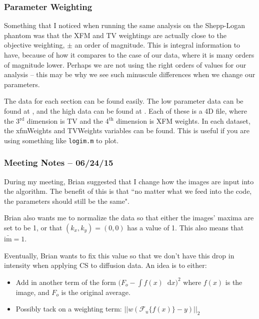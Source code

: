 \documentclass[11 pt]{article}
\newcommand*\diff{\mathop{}\!\mathrm{d}}
\begin{document}
    \subsubsection{Parameter Weighting}
      Something that I noticed when running the same analysis on the Shepp-Logan phantom was that the XFM and TV weightings are actually close to the objective weighting, $\pm$ an order of magnitude. This is integral information to have, because of how it compares to the case of our data, where it is many orders of magnitude lower. Perhaps we are not using the right orders of values for our analysis -- this may be why we see such minuscule differences when we change our parameters.

      The data for each section can be found easily. The low parameter data can be found at , and the high data can be found at . Each of these is a 4D file, where the 3$^{\text{rd}}$ dimension is TV and the 4$^{\text{th}}$ dimension is XFM weights. In each dataset, the xfmWeights and TVWeights variables can be found. This is useful if you are using something like \texttt{logim.m} to plot. \\

  \subsubsection{Meeting Notes -- 06/24/15}
    During my meeting, Brian suggested that I change how the images are input into the algorithm. The benefit of this is that ``no matter what we feed into the code, the parameters should still be the same". 

    Brian also wants me to normalize the data so that either the images' maxima are set to be 1, or that  $(k_x,k_y) = (0,0)$ has a value of 1. This also means that $\bar{\text{im}} = 1$. 

    Eventually, Brian wants to fix this value so that we don't have this drop in intensity when applying CS to diffusion data. An idea is to either: 

    \begin{itemize}
      \item Add in another term of the form $(F_o - \int{f(x)\diff x)^2}$ where $f(x)$ is the image, and $F_o$ is the original average.
      \item Possibly tack on a weighting term: $||w (\mathcal{F}_u\{f(x)\} - y)||_2$
      \end{itemize}
\end{document}
